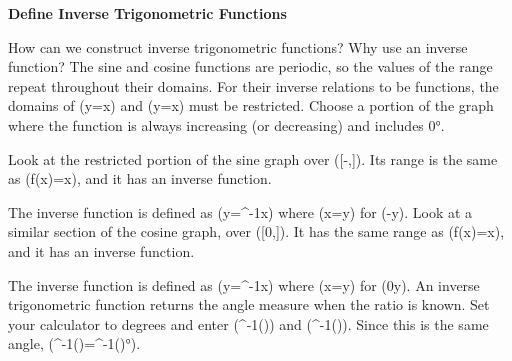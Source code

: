 \documentclass{article}
\newenvironment{example}[1]{}{}         %
\newcommand{\answer}[1]{}               %
\newcommand{\placeholder}[2]{}          %
\newcommand{\te}[1]{}                   %
\begin{document}
\begin{example}{1}
\textbf{Define Inverse Trigonometric Functions}
\te{CONCEPTUAL UNDERSTANDING. ESSENTIAL QUESTION How can you use an inverse function to find all the solutions of a trigonometric equation?}
How can we construct inverse trigonometric functions? Why use an inverse function?
The sine and cosine functions are periodic, so the values of the range repeat throughout their domains. For their inverse relations to be functions, the domains of (y=\sin x) and (y=\cos x) must be restricted. Choose a portion of the graph where the function is always increasing (or decreasing) and includes 0°.
\te{LOOK FOR RELATIONSHIPS How do the domain and range of the sine function relate to those of its inverse function?}
Look at the restricted portion of the sine graph over ([-\frac{},\frac{}]). Its range is the same as (f(x)=\sin x), and it has an inverse function.
\placeholder{graph}{Red sine wave on black arrowed x,y axes,O; x labels-pi,pi, grid pi/2; y labels-1,1,grid1/2,window-2pi..2pi,-1.5..1.5. Blue rectangle highlights -pi/2..pi/2. Red curve throughorigin, maxima(pi/2,1),(-3pi/2,1),minima(-pi/2,-1),(3pi/2,-1); curve end arrows.}
The inverse function is defined as (y=\sin^{-1}x) where (x=\sin y) for (-\frac{}\leq y\leq\frac{}).
Look at a similar section of the cosine graph, over ([0,\pi]). It has the same range as (f(x)=\cos x), and it has an inverse function.
\placeholder{graph}{Red cosine on black arrowed x,y axes,O;x labels-pi,pi,gridpi/2;y labels-1,1,grid1/2;window-2pi..2pi,-1.5..1.5. Blue rectangle highlights0..pi. Red maximum(0,1), minima(+-pi,-1),end arrows.}
The inverse function is defined as (y=\cos^{-1}x) where (x=\cos y) for (0\leq y\leq\pi).
An inverse trigonometric function returns the angle measure when the ratio is known. Set your calculator to degrees and enter (\cos^{-1}()) and (\sin^{-1}()). Since this is the same angle, (\cos^{-1}()=\sin^{-1}()°).
\placeholder{diagram}{Black unit circle on gray square grid .2 units,arrowed x,y axes,O, labels+-1 bothaxes,window+-1.2. Red radius tofilledpoint(3/5,4/5) inquadrantI,redtheta counterclockwisearc frompositivexaxis;bluegiven arrowtopoint,blueunknown arrowtotheta.}
\answer{Restrict the domains to intervals on which the functions are always increasing or decreasing and include 0°. An inverse trigonometric function returns the angle measure when the ratio is known; (\cos^{-1}(3/5)=\sin^{-1}(4/5)\approx53.1°).}
\end{example}
\end{document}
